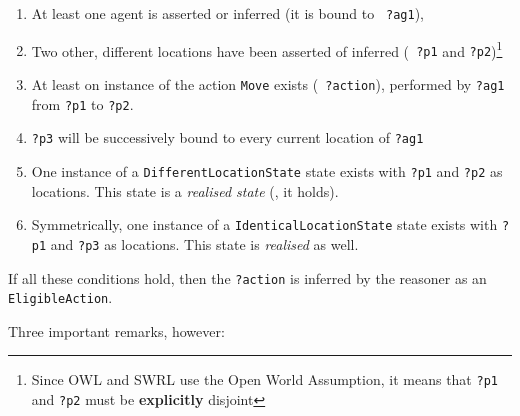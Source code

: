 \begin{enumerate}

    \item  At least one agent is asserted or inferred (it is bound to {\tt
    ?ag1}),

    \item  Two other, different locations have been asserted of inferred ({\tt
    ?p1} and {\tt ?p2})\footnote{Since OWL and SWRL use the Open World
    Assumption, it means that {\tt ?p1} and {\tt ?p2} must be {\bf explicitly}
    disjoint}

    \item  At least on instance of the action {\tt Move} exists ({\tt
    ?action}), performed by {\tt ?ag1} from {\tt ?p1} to {\tt ?p2}.

    \item  {\tt ?p3} will be successively bound to every current location of
    {\tt ?ag1}

    \item  One instance of a {\tt DifferentLocationState} state exists with
    {\tt ?p1} and {\tt ?p2} as locations. This state is a \emph{realised
    state} (\ie, it holds).

    \item  Symmetrically, one instance of a {\tt IdenticalLocationState}
    state exists with {\tt ?p1} and {\tt ?p3} as locations. This state is
    \emph{realised} as well.

\end{enumerate}

If all these conditions hold, then the {\tt ?action} is inferred by the
reasoner as an {\tt EligibleAction}.

Three important remarks, however:


